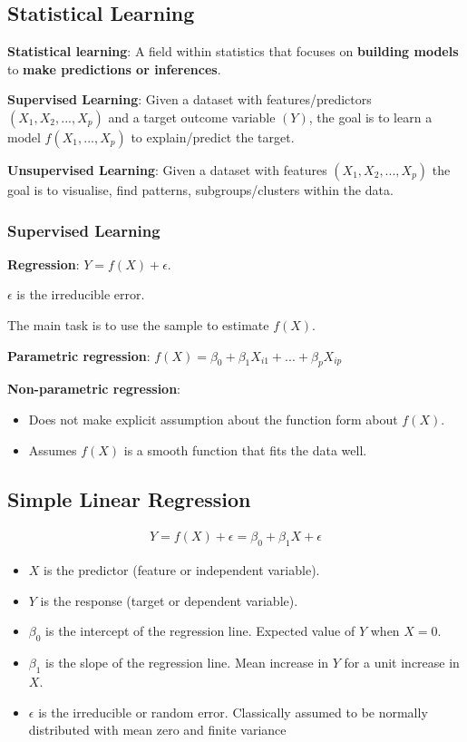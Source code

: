 \subsection{Statistical Learning}

\noindent\textbf{Statistical learning}: A field within statistics that focuses on \textbf{building models} to \textbf{make predictions or inferences}.

\noindent\textbf{Supervised Learning}: Given a dataset with features/predictors $(X_1,X_2,...,X_p)$ and a target outcome variable $(Y)$, the goal is to learn a model $f(X_1,...,X_p)$ to explain/predict the target.

\noindent\textbf{Unsupervised Learning}: Given a dataset with features $(X_1,X_2,...,X_p)$ the goal is to visualise, find patterns, subgroups/clusters within the data.

\subsubsection{Supervised Learning}

\noindent\textbf{Regression}: $Y = f(X)+\epsilon$.

$\epsilon$ is the irreducible error.

The main task is to use the sample to estimate $f(X)$.

\noindent\textbf{Parametric regression}: $f(X) = \beta_0+\beta_1 X_{i1}+...+\beta_p X_{ip}$

\noindent\textbf{Non-parametric regression}:

\begin{itemize}
    \item Does not make explicit assumption about the function form about $f(X)$.
    \item Assumes $f(X)$ is a smooth function that fits the data well.
\end{itemize}

\subsection{Simple Linear Regression}

\begin{align*}
    Y = f(X)+\epsilon = \beta_0+\beta_1 X+\epsilon
\end{align*}

\begin{itemize}
    \item $X$ is the predictor (feature or independent variable).
    \item $Y$ is the response (target or dependent variable).
    \item $\beta_0$ is the intercept of the regression line. Expected value of $Y$ when $X=0$.
    \item $\beta_1$ is the slope of the regression line. Mean increase in $Y$ for a unit increase in $X$.
    \item $\epsilon$ is the irreducible or random error. Classically assumed to be normally distributed with mean zero and finite variance
\end{itemize}

